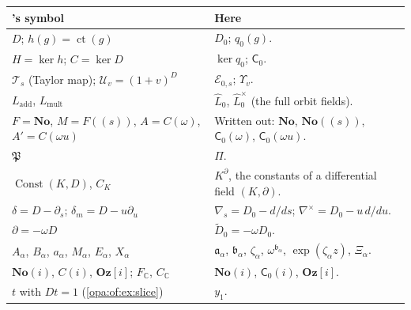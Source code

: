 \documentclass[11pt,oneside]{article}
\numberwithin{equation}{section}
\theoremstyle{definition}
\theoremstyle{remark}
\newcommand{\No}{\mathbf{No}}
\newcommand{\Oz}{\mathbf{Oz}}
\newcommand{\Og}{\mathbf{Oz}[i]}
\newcommand{\SC}{\mathbf{No}(i)}
\newcommand{\C}{\mathbb C}
\newcommand{\EE}{\mathcal E}
\newcommand{\ct}{\operatorname{ct}}
\begin{document}
\begin{center}
\renewcommand{\arraystretch}{1.15}
\begin{longtable}{>{\raggedright\arraybackslash}p{}>{\raggedright\arraybackslash}p{}}
\toprule
17's symbol & Here\\
\midrule
\endhead
$D$; $h(g)=\ct(g)$ & $D_0$; $q_0(g)$.\\
$H=\ker h$; $C=\ker D$ & $\ker q_0$; $\mathsf C_0$.\\
$\mathcal T_s$ (Taylor map); $\mathcal U_v=(1+v)^D$ & $\EE_{0,s}$; $\Upsilon_v$.\\
$L_{\mathrm{add}}$, $L_{\mathrm{mult}}$ & $\widehat L_0$, $\widehat L^\times_0$ (the full orbit fields).\\
$F=\No$, $M=F((s))$, $A=C(\omega)$, $A'=C(\omega u)$ & Written out: $\No$, $\No((s))$, $\mathsf C_0(\omega)$,
$\mathsf C_0(\omega u)$.\\
$\mathfrak P$ & $\Pi$.\\
$\operatorname{Const}(K,D)$, $C_K$ & $K^\partial$, the constants of a differential field $(K,\partial)$.\\
$\delta=D-\partial_s$; $\delta_m=D-u\partial_u$ & $\nabla_{\!s}=D_0-d/ds$; $\nabla^\times=D_0-u\,d/du$.\\
$\partial=-\omega D$ & $\widetilde D_0=-\omega D_0$.\\
$A_\alpha$, $B_\alpha$, $a_\alpha$, $M_\alpha$, $E_\alpha$, $X_\alpha$ & $\mathfrak a_\alpha$, $\mathfrak b_\alpha$,
$\zeta_\alpha$, $\omega^{\mathfrak b_\alpha}$, $\exp(\zeta_\alpha z)$, $\Xi_\alpha$.\\
$\No(i)$, $C(i)$, $\Oz[i]$; $F_\C$, $C_\C$ & $\SC$, $\mathsf C_0(i)$, $\Og$.\\
$t$ with $Dt=1$ (\cref{opa:of:ex:slice}) & $y_1$.\\
\bottomrule
\end{longtable}
\end{center}
\end{document}
